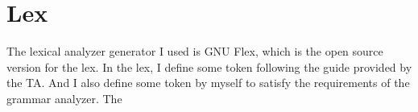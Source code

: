 \documentclass{article}
\begin{document}
    \section{Lex}
        The lexical analyzer generator I used is GNU Flex, which is the open source version for the
        lex. In the lex, I define some token following the guide provided by the TA. And I also define some
        token by myself to satisfy the requirements of the grammar analyzer. The 
\end{document}

